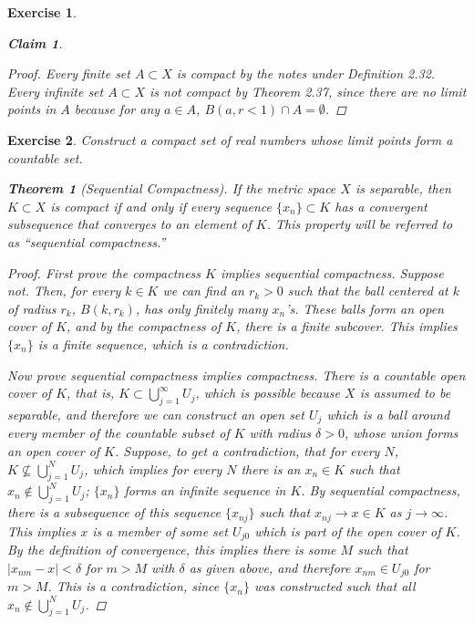 \documentclass[10pt,letterpaper]{amsart}
\newtheorem*{theorem}{Theorem}
\newtheorem{exercise}{Exercise}[section]
\newtheorem*{claim}{Claim}
\theoremstyle{definition}
\theoremstyle{remark}
\numberwithin{equation}{exercise}
\begin{document}
\begin{multicols}{2}
\begin{exercise}
\begin{claim}
    \end{claim}
    \begin{proof}
      Every finite set $A \subset X$ is compact by the notes under Definition 2.32. Every infinite set $A \subset X$ is not compact by Theorem 2.37, since there are no limit points in $A$ because for any $a \in A$, $B(a,r<1) \cap A = \emptyset$.
    \end{proof}
  \end{exercise}
  \setcounter{exercise}{12}
  \begin{exercise}\label{2.13}
    Construct a compact set of real numbers whose limit points form a countable set.
    \begin{theorem}[Sequential Compactness]
      If the metric space $X$ is separable, then $K \subset X$ is compact if and only if every sequence $\{x_n\} \subset K$ has a convergent subsequence that converges to an element of $K$. This property will be referred to as ``sequential compactness.''
    \end{theorem}
    \begin{proof}
      First prove the compactness $K$ implies sequential compactness. Suppose not. Then, for every $k \in K$ we can find an $r_k > 0$ such that the ball centered at $k$ of radius $r_k$, $B(k,r_k)$, has only finitely many $x_n$'s. These balls form an open cover of $K$, and by the compactness of $K$, there is a finite subcover. This implies $\{x_n\}$ is a finite sequence, which is a contradiction.
      \par Now prove sequential compactness implies compactness. There is a countable open cover of $K$, that is, $K \subset \bigcup_{j=1}^\infty U_j$, which is possible because $X$ is assumed to be separable, and therefore we can construct an open set $U_j$ which is a ball around every member of the countable subset of $K$ with radius $\delta > 0$, whose union forms an open cover of $K$. Suppose, to get a contradiction, that for every $N$, $K \nsubseteq \bigcup_{j=1}^N U_j$, which implies for every $N$ there is an $x_n \in K$ such that $x_n \notin \bigcup_{j=1}^N U_j$; $\{x_n\}$ forms an infinite sequence in $K$. By sequential compactness, there is a subsequence of this sequence $\{x_{nj}\}$ such that $x_{nj} \to x \in K$ as $j \to \infty$. This implies $x$ is a member of some set $U_{j0}$ which is part of the open cover of $K$. By the definition of convergence, this implies there is some $M$ such that $|x_{nm} - x| < \delta$ for $m > M$ with $\delta$ as given above, and therefore $x_{nm} \in U_{j0}$ for $m > M$. This is a contradiction, since $\{x_n\}$ was constructed such that all $x_n \notin \bigcup_{j=1}^N U_j$.

\end{proof}
\end{exercise}
\end{multicols}
\end{document}
